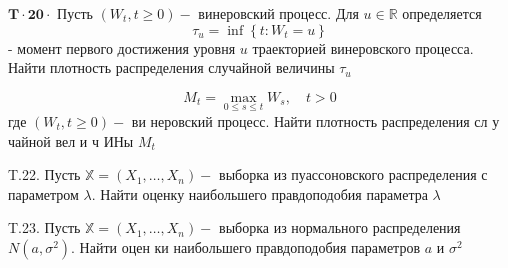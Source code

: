 \documentclass[a4paper,12pt]{article} %
\begin{document}
\begin{example}

$\mathbf{T} \cdot \mathbf{2} \mathbf{0} \cdot$ Пусть $\left(W_{t}, t \geq 0\right)-$ винеровский процесс. Для $u \in \mathbb{R}$ определяется
$$
\tau_{u}=\inf \left\{t: W_{t}=u\right\}
$$
- момент первого достижения уровня $u$ траекторией винеровского процесса. Найти плотность распределения случайной величины $\tau_{u}$




\end{example}






\begin{example}

$$
M_{t}=\max _{0 \leq s \leq t} W_{s}, \quad t>0
$$
где $\left(W_{t}, t \geq 0\right)-$ ви неровский процесс. Найти плотность распределения сл у чайной вел и ч ИНы $M_{t}$




\end{example}



\begin{example}

T.22. Пусть $\mathbb{X}=\left(X_{1}, \ldots, X_{n}\right)-$ выборка из пуассоновского распределения
с параметром $\lambda .$ Найти оценку наибольшего правдоподобия параметра
$\lambda$




\end{example}



\begin{example}

T.23. Пусть $\mathbb{X}=\left(X_{1}, \ldots, X_{n}\right)-$ выборка из нормального распределения $N\left(a, \sigma^{2}\right) .$ Найти оцен ки наибольшего правдоподобия параметров $a$ и $\sigma^{2}$




\end{example}






\printindex



\end{document}
